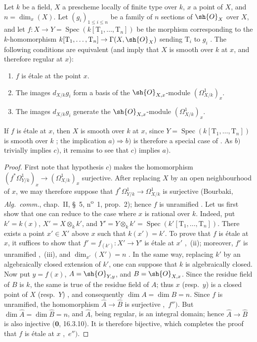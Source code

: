 \begin{proposition}[17.15.3]
\label{IV.17.15.3}
Let $k$ be a field, $X$ a prescheme locally of finite type over $k$, $x$ a point of $X$, and $n=\dim_x(X)$.
Let $(g_i)_{1\leq i\leq n}$ be a family of $n$ sections of $\sh{O}_X$ over $X$, and let $f:X\to Y=\operatorname{Spec}(k[\mathrm{T}_1,\ldots,\mathrm{T}_n])$ be the morphism corresponding to the $k$-homomorphism $k[\mathrm{T}_1,\ldots,\mathrm{T}_n]\to\Gamma(X,\sh{O}_X)$ sending $\mathrm{T}_i$ to $g_i$ .
The following conditions are equivalent (and imply that $X$ is smooth over $k$ at $x$, and therefore regular at $x$):
\begin{enumerate}
  \item[a)] $f$ is \'etale at the point $x$.
  \item[b)] The images $d_{X/k}g_i$ form a basis of the $\sh{O}_{X,x}$-module $(\Omega^1_{X/k})_x$.
  \item[c)] The images $d_{X/k}g_i$ generate the $\sh{O}_{X,x}$-module $(\Omega^1_{X/k})_x$.
\end{enumerate}
If $f$ is \'etale at $x$, then $X$ is smooth over $k$ at $x$, since $Y=\operatorname{Spec}(k[\mathrm{T}_1,\ldots,\mathrm{T}_n])$ is smooth over $k$ ; the implication $a)\Rightarrow b)$ is therefore a special case of .
As $b)$ trivially implies $c)$, it remains to see that $c)$ implies $a)$.
\end{proposition}

\begin{proof}
First note that hypothesis $c)$ makes the homomorphism $(f^*\Omega^1_{Y/k})_x\to(\Omega^1_{X/k})_x$ surjective.  After replacing $X$ by an open neighbourhood of $x$, we may therefore suppose that $f^*\Omega^1_{Y/k}\to\Omega^1_{X/k}$ is surjective (Bourbaki, \emph{Alg.~comm.}, chap.~II, \S~5, n\textsuperscript{o}~1, prop.~2); hence $f$ is unramified .
Let us first show that one can reduce to the case where $x$ is rational over $k$.
Indeed, put $k'=k(x)$, $X'=X\otimes_k k'$, and $Y'=Y\otimes_k k'=\operatorname{Spec}(k'[\mathrm{T}_1,\ldots,\mathrm{T}_n])$.  There exists a point $x'\in X'$ above $x$ such that $k(x')=k'$.
To prove that $f$ is \'etale at $x$, it suffices to show that $f'=f_{(k')}:X'\to Y'$ is \'etale at $x'$ ,~(ii); moreover, $f'$ is unramified ,~(iii), and $\dim_{x'}(X')=n$ .
In the same way, replacing $k'$ by an algebraically closed extension of $k'$, one can suppose that $k$ is algebraically closed.
Now put $y=f(x)$, $A=\sh{O}_{Y,y}$, and $B=\sh{O}_{X,x}$.  Since the residue field of $B$ is $k$, the same is true of the residue field of $A$; thus $x$ (resp.\ $y$) is a closed point of $X$ (resp.\ $Y$) , and consequently $\dim A=\dim B=n$.
Since $f$ is unramified, the homomorphism $\widehat A\to\widehat B$ is surjective ,~$f'')$.  But $\dim\widehat A=\dim\widehat B=n$, and $\widehat A$, being regular, is an integral domain; hence $\widehat A\to\widehat B$ is also injective ($\mathbf{0}$, 16.3.10).  It is therefore bijective, which completes the proof that $f$ is \'etale at $x$ ,~$e'')$.
\end{proof}

